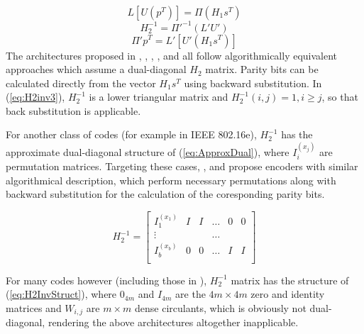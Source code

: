                  \begin{equation}
                         L[U(p^{T})]=\Pi(H_{1}s^{T})
                        \label{eq:LUH2-2}
                 \end{equation}  
                 \begin{equation}       
                        H_{2}^{-1}=\Pi'^{-1}(L'U')              
                        \label{eq:LUH2inv-1}
                 \end{equation}  
                 \begin{equation}
                        \Pi' p^{T}=L'[U'(H_{1}s^{T})]
                        \label{eq:LUH2inv-2}
                 \end{equation}
 The architectures proposed in \cite{Gomes2007}, \cite{AlHariri2013}, \cite{ZhiyongHe2006}, \cite{Hariri2014}, \cite{Perez2010a} and \cite{YongminJung2012} all follow algorithmically equivalent approaches which assume a dual-diagonal $H_2$ matrix. Parity bits can be calculated directly from the vector $H_{1}s^{T}$ using backward substitution. In  (\ref{eq:H2inv3}), $H_{2}^{-1}$ is a lower triangular matrix and $H_{2}^{-1}(i,j)=1, i\geq j$, so that back substitution is applicable.\par
For another class of codes (for example in IEEE 802.16e), $H_2^{-1}$ has the approximate dual-diagonal structure of (\ref{eq:ApproxDual}), where $I_{i}^{(x_{j})}$ are permutation matrices. Targeting these cases, \cite{Neto2015}, \cite{Kopparthi2007} and \cite{Chia-YuLin2008} propose  encoders with similar algorithmical description, which perform necessary permutations along with backward substitution for the calculation of the coresponding parity bits.\par         
    \begin{equation}
        H_{2}^{-1}=\left[
        \begin{array}{c|ccccc}
        I_{1}^{(x_{1})} & I & I & \dots &       0    & 0\\
        \vdots & & & \dots \\
        I_{b}^{(x_{b})} & 0 & 0 & \dots & I & I\\
        \end{array}\right]
    \label{eq:ApproxDual}
    \end{equation}\par
For many codes however (including those in \cite{CCSDS131.0}), $H_{2}^{-1}$ matrix has the structure of (\ref{eq:H2InvStruct}), where $0_{4m}$ and $I_{4m}$ are the $4m \times 4m$ zero and identity matrices and $W_{i,j}$ are $m \times m$ dense circulants, which is obviously not dual-diagonal, rendering the above architectures altogether inapplicable.
